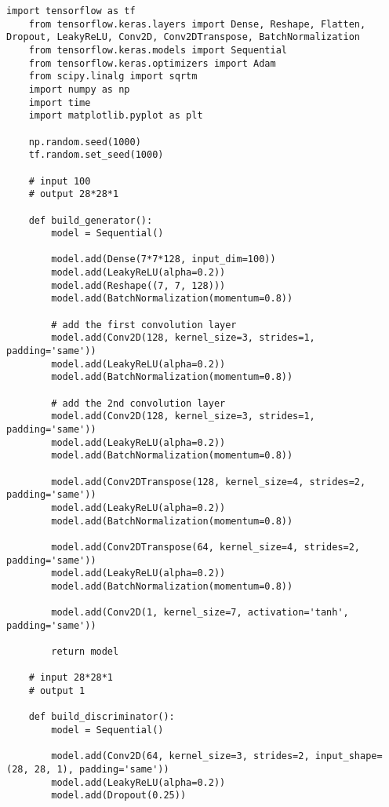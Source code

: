 \begin{lstlisting}[style=mypython, caption= {Explore GAN with 5 Convolutional Layers in Generator \\ and 3 Convolutional Layers in Discriminator}]
    import tensorflow as tf
    from tensorflow.keras.layers import Dense, Reshape, Flatten, Dropout, LeakyReLU, Conv2D, Conv2DTranspose, BatchNormalization
    from tensorflow.keras.models import Sequential
    from tensorflow.keras.optimizers import Adam
    from scipy.linalg import sqrtm
    import numpy as np
    import time
    import matplotlib.pyplot as plt
    
    np.random.seed(1000)
    tf.random.set_seed(1000)
    
    # input 100
    # output 28*28*1
    
    def build_generator():
        model = Sequential()
        
        model.add(Dense(7*7*128, input_dim=100))
        model.add(LeakyReLU(alpha=0.2))
        model.add(Reshape((7, 7, 128)))
        model.add(BatchNormalization(momentum=0.8))
    
        # add the first convolution layer
        model.add(Conv2D(128, kernel_size=3, strides=1, padding='same'))
        model.add(LeakyReLU(alpha=0.2))
        model.add(BatchNormalization(momentum=0.8))
    
        # add the 2nd convolution layer
        model.add(Conv2D(128, kernel_size=3, strides=1, padding='same'))
        model.add(LeakyReLU(alpha=0.2))
        model.add(BatchNormalization(momentum=0.8))
    
        model.add(Conv2DTranspose(128, kernel_size=4, strides=2, padding='same'))
        model.add(LeakyReLU(alpha=0.2))
        model.add(BatchNormalization(momentum=0.8))
    
        model.add(Conv2DTranspose(64, kernel_size=4, strides=2, padding='same'))
        model.add(LeakyReLU(alpha=0.2))
        model.add(BatchNormalization(momentum=0.8))
    
        model.add(Conv2D(1, kernel_size=7, activation='tanh', padding='same'))
    
        return model
    
    # input 28*28*1
    # output 1
    
    def build_discriminator():
        model = Sequential()
        
        model.add(Conv2D(64, kernel_size=3, strides=2, input_shape=(28, 28, 1), padding='same'))
        model.add(LeakyReLU(alpha=0.2))
        model.add(Dropout(0.25))
    

\end{lstlisting}
